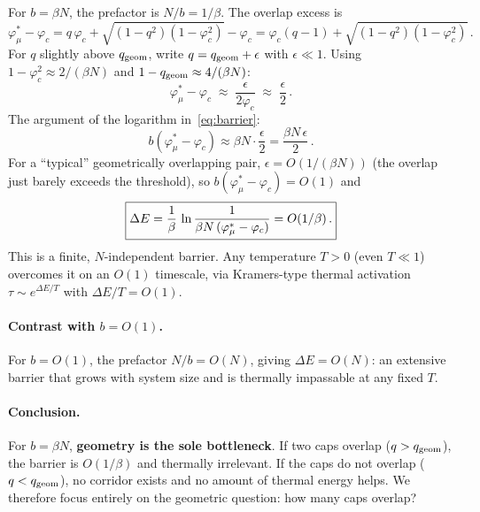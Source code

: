 \documentclass[11pt]{article}
\newcommand{\vp}{\varphi}
\begin{document}
For $b = \beta N$, the prefactor is $N/b = 1/\beta$.
The overlap excess is
\begin{equation}\label{eq:phi_excess}
  \vp_\mu^* - \vp_c
  = q\,\vp_c + \sqrt{(1-q^2)(1-\vp_c^2)} - \vp_c
  = \vp_c(q - 1) + \sqrt{(1-q^2)(1-\vp_c^2)}\,.
\end{equation}
For $q$ slightly above $q_{\rm geom}$,
write $q = q_{\rm geom} + \epsilon$
with $\epsilon \ll 1$.
Using $1 - \vp_c^2 \approx 2/(\beta N)$ and
$1 - q_{\rm geom} \approx 4/(\beta N)$:
\begin{equation}
  \vp_\mu^* - \vp_c
  \;\approx\; \frac{\epsilon}{2\vp_c}
  \;\approx\; \frac{\epsilon}{2}\,.
\end{equation}
The argument of the logarithm in~\eqref{eq:barrier}:
\begin{equation}
  b(\vp_\mu^* - \vp_c)
  \approx \beta N \cdot \frac{\epsilon}{2}
  = \frac{\beta N\,\epsilon}{2}\,.
\end{equation}
For a ``typical'' geometrically overlapping pair,
$\epsilon = O(1/(\beta N))$ (the overlap just barely exceeds
the threshold), so $b(\vp_\mu^* - \vp_c) = O(1)$ and
\begin{equation}\label{eq:barrier_bN}
  \boxed{%
  \Delta E = \frac{1}{\beta}\,
  \ln\frac{1}{\beta N\,(\vp_\mu^* - \vp_c)}
  = O(1/\beta)\,.}
\end{equation}
This is a finite, $N$-independent barrier.
Any temperature $T > 0$ (even $T \ll 1$) overcomes it
on an $O(1)$ timescale, via Kramers-type thermal activation
$\tau \sim e^{\Delta E / T}$ with $\Delta E/T = O(1)$.

\paragraph{Contrast with $b = O(1)$.}
For $b = O(1)$, the prefactor $N/b = O(N)$, giving
$\Delta E = O(N)$: an extensive barrier that grows with
system size and is thermally impassable at any fixed $T$.

\paragraph{Conclusion.}
For $b = \beta N$, \textbf{geometry is the sole bottleneck}.
If two caps overlap ($q > q_{\rm geom}$), the barrier is $O(1/\beta)$
and thermally irrelevant.
If the caps do not overlap ($q < q_{\rm geom}$), no corridor
exists and no amount of thermal energy helps.
We therefore focus entirely on the geometric question:
how many caps overlap?
\end{document}
